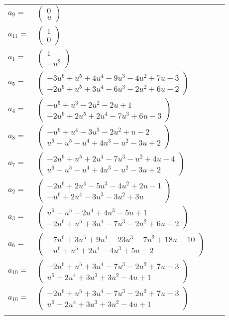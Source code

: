 \documentclass[1p]{elsarticle_modified}
\theoremstyle{definition}
\begin{document}
\begin{tabular}{m{7pt} m{180pt} m{7pt} m{180pt} }
\flushright $a_{9}=$&$\begin{pmatrix}0\\u\end{pmatrix}$ \\
\flushright $a_{11}=$&$\begin{pmatrix}1\\0\end{pmatrix}$ \\
\flushright $a_{1}=$&$\begin{pmatrix}1\\- u^2\end{pmatrix}$ \\
\flushright $a_{5}=$&$\begin{pmatrix}-3 u^6+u^5+4 u^4-9 u^3-4 u^2+7 u-3\\-2 u^6+u^5+3 u^4-6 u^3-2 u^2+6 u-2\end{pmatrix}$ \\
\flushright $a_{4}=$&$\begin{pmatrix}- u^5+u^3-2 u^2-2 u+1\\-2 u^6+2 u^5+2 u^4-7 u^3+6 u-3\end{pmatrix}$ \\
\flushright $a_{8}=$&$\begin{pmatrix}- u^6+u^4-3 u^3-2 u^2+u-2\\u^6- u^5- u^4+4 u^3- u^2-3 u+2\end{pmatrix}$ \\
\flushright $a_{7}=$&$\begin{pmatrix}-2 u^6+u^5+2 u^4-7 u^3- u^2+4 u-4\\u^6- u^5- u^4+4 u^3- u^2-3 u+2\end{pmatrix}$ \\
\flushright $a_{2}=$&$\begin{pmatrix}-2 u^6+2 u^4-5 u^3-4 u^2+2 u-1\\- u^6+2 u^4-3 u^3-3 u^2+3 u\end{pmatrix}$ \\
\flushright $a_{3}=$&$\begin{pmatrix}u^6- u^5-2 u^4+4 u^3-5 u+1\\-2 u^6+u^5+3 u^4-7 u^3-2 u^2+6 u-2\end{pmatrix}$ \\
\flushright $a_{6}=$&$\begin{pmatrix}-7 u^6+3 u^5+9 u^4-23 u^3-7 u^2+18 u-10\\- u^6+u^5+2 u^4-4 u^3+5 u-2\end{pmatrix}$ \\
\flushright $a_{10}=$&$\begin{pmatrix}-2 u^6+u^5+3 u^4-7 u^3-2 u^2+7 u-3\\u^6-2 u^4+3 u^3+3 u^2-4 u+1\end{pmatrix}$\\ \flushright $a_{10}=$&$\begin{pmatrix}-2 u^6+u^5+3 u^4-7 u^3-2 u^2+7 u-3\\u^6-2 u^4+3 u^3+3 u^2-4 u+1\end{pmatrix}$\\&\end{tabular}
\end{document}
